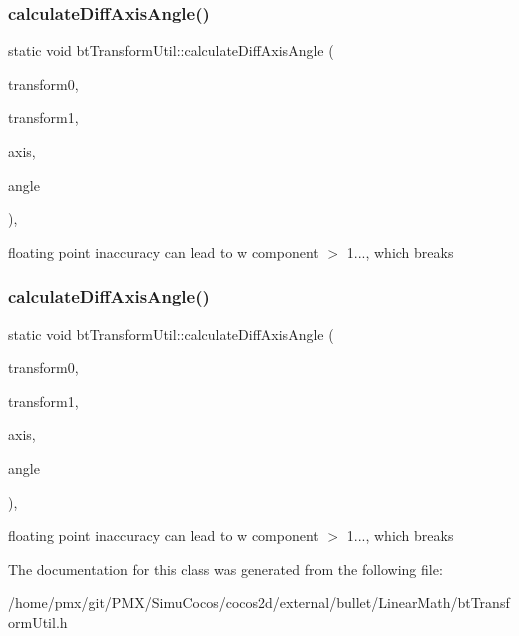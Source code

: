\subsubsection{\texorpdfstring{calculate\+Diff\+Axis\+Angle()}{calculateDiffAxisAngle()}\hspace{0.1cm}{\footnotesize\ttfamily [1/2]}}
{\footnotesize\ttfamily static void bt\+Transform\+Util\+::calculate\+Diff\+Axis\+Angle (\begin{DoxyParamCaption}\item[{const bt\+Transform \&}]{transform0,  }\item[{const bt\+Transform \&}]{transform1,  }\item[{bt\+Vector3 \&}]{axis,  }\item[{bt\+Scalar \&}]{angle }\end{DoxyParamCaption})\hspace{0.3cm}{\ttfamily [inline]}, {\ttfamily [static]}}

floating point inaccuracy can lead to w component $>$ 1..., which breaks \mbox{\label{classbtTransformUtil_a39f53b05940a57082053067bd5e337ec}} 
\subsubsection{\texorpdfstring{calculate\+Diff\+Axis\+Angle()}{calculateDiffAxisAngle()}\hspace{0.1cm}{\footnotesize\ttfamily [2/2]}}
{\footnotesize\ttfamily static void bt\+Transform\+Util\+::calculate\+Diff\+Axis\+Angle (\begin{DoxyParamCaption}\item[{const bt\+Transform \&}]{transform0,  }\item[{const bt\+Transform \&}]{transform1,  }\item[{bt\+Vector3 \&}]{axis,  }\item[{bt\+Scalar \&}]{angle }\end{DoxyParamCaption})\hspace{0.3cm}{\ttfamily [inline]}, {\ttfamily [static]}}

floating point inaccuracy can lead to w component $>$ 1..., which breaks 

The documentation for this class was generated from the following file\+:\begin{DoxyCompactItemize}
\item 
/home/pmx/git/\+P\+M\+X/\+Simu\+Cocos/cocos2d/external/bullet/\+Linear\+Math/bt\+Transform\+Util.\+h\end{DoxyCompactItemize}
